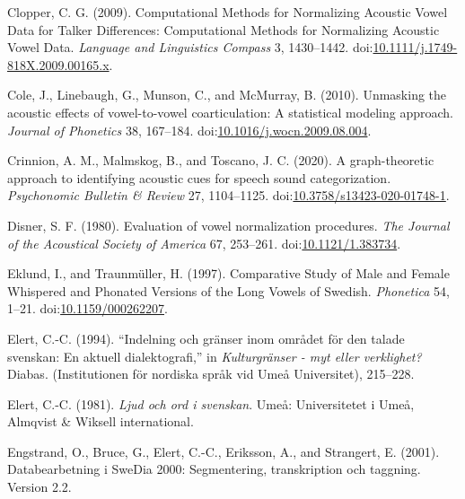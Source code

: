 \documentclass[utf8]{frontiersSCNS}
\newlength{\cslhangindent}
\newlength{\cslentryspacingunit} %
\newenvironment{CSLReferences}[2] %
 {%
  \setlength{\parindent}{0pt}
  \ifodd #1
  \let\oldpar\par
  \def\par{\hangindent=\cslhangindent\oldpar}
  \fi
  \setlength{\parskip}{#2\cslentryspacingunit}
 }%
 {}
\begin{document}
\begin{CSLReferences}{1}{0}
\leavevmode{}%
Clopper, C. G. (2009). Computational {Methods} for {Normalizing Acoustic Vowel Data} for {Talker Differences}: {Computational Methods} for {Normalizing Acoustic Vowel Data}. \emph{Language and Linguistics Compass} 3, 1430--1442. doi:\href{https://doi.org/10.1111/j.1749-818X.2009.00165.x}{10.1111/j.1749-818X.2009.00165.x}.

\leavevmode{}%
Cole, J., Linebaugh, G., Munson, C., and McMurray, B. (2010). Unmasking the acoustic effects of vowel-to-vowel coarticulation: {A} statistical modeling approach. \emph{Journal of Phonetics} 38, 167--184. doi:\href{https://doi.org/10.1016/j.wocn.2009.08.004}{10.1016/j.wocn.2009.08.004}.

\leavevmode{}%
Crinnion, A. M., Malmskog, B., and Toscano, J. C. (2020). A graph-theoretic approach to identifying acoustic cues for speech sound categorization. \emph{Psychonomic Bulletin \& Review} 27, 1104--1125. doi:\href{https://doi.org/10.3758/s13423-020-01748-1}{10.3758/s13423-020-01748-1}.

\leavevmode{}%
Disner, S. F. (1980). Evaluation of vowel normalization procedures. \emph{The Journal of the Acoustical Society of America} 67, 253--261. doi:\href{https://doi.org/10.1121/1.383734}{10.1121/1.383734}.

\leavevmode{}%
Eklund, I., and Traunmüller, H. (1997). Comparative {Study} of {Male} and {Female Whispered} and {Phonated Versions} of the {Long Vowels} of {Swedish}. \emph{Phonetica} 54, 1--21. doi:\href{https://doi.org/10.1159/000262207}{10.1159/000262207}.

\leavevmode{}%
Elert, C.-C. (1994). {``Indelning och gränser inom området för den talade svenskan: {En} aktuell dialektografi,''} in \emph{Kulturgränser - myt eller verklighet?} Diabas. ({Institutionen för nordiska språk vid Umeå Universitet}), 215--228.

\leavevmode{}%
Elert, C.-C. (1981). \emph{Ljud och ord i svenskan}. {Umeå}: {Universitetet i Umeå, Almqvist \& Wiksell international}.

\leavevmode{}%
Engstrand, O., Bruce, G., Elert, C.-C., Eriksson, A., and Strangert, E. (2001). Databearbetning i {SweDia} 2000: Segmentering, transkription och taggning. {Version} 2.2.


\end{CSLReferences}
\end{document}

